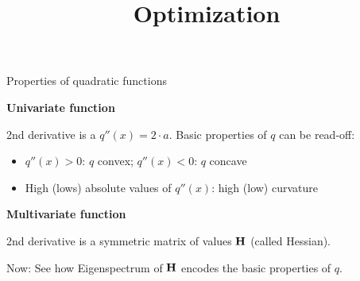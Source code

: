 




\newcommand{\titlefigure}{figure_man/quadratic_functions_2D_example_2_4.png}
\newcommand{\learninggoals}{
\item Geometry of quadratic forms
\item Eigenspectrum}


\title{Optimization}
\date{}



\sloppy


\begin{vbframe}{Properties of quadratic functions}

  \textbf{Univariate function} \vspace*{0.2cm}
  
  2nd derivative is a $q''(x) = 2 \cdot a$. Basic properties of $q$ can be read-off: 
  
  \begin{itemize}
    \item $q''(x) > 0$: $q$ convex; $q''(x) < 0$: $q$ concave
    \item High (lows) absolute values of $q''(x)$: high (low) curvature
  \end{itemize}
  
  \vspace*{0.2cm}
  
  \textbf{Multivariate function}\vspace*{0.2cm}
  
  2nd derivative is a symmetric matrix of values $\bf{H}$ (called Hessian). 
  
  \lz 
  
  Now: See how Eigenspectrum of $\bf{H}$ encodes the basic properties of $q$. 
  
  \end{vbframe}
  
